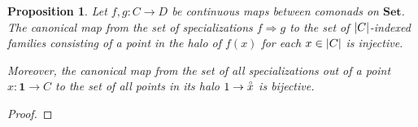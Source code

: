 \documentclass[11pt, oneside, article]{memoir}
\theoremstyle{plain}
\newtheorem{proposition}[theorem]{Proposition}
\theoremstyle{definition}
\theoremstyle{remark}
\DeclareMathOperator{\id}{id}
\DeclarePairedDelimiter{\abs}{\lvert}{\rvert}
\newcommand{\bang}{\mathrm{!}}
\newcommand{\namedcat}[1]{\mathbf{#1}}
\newcommand{\cat}[1]{\mathbf{#1}}
\newcommand{\Set}{\namedcat{Set}}
\newcommand{\CoalgOn}[2]{{#2}^{#1}}
\newcommand{\CoalgS}[1]{\CoalgOn{#1}{\bS}}
\newcommand{\clift}[1]{\overline{#1}}
\newcommand{\pts}[1]{{\abs{#1}}}
\newcommand{\one}[1]{\pts{#1}}
\newcommand{\halo}[1]{\accentset{\circ}{#1}}
\newcommand{\reindex}[1]{\Delta_{#1}}
\newcommand{\point}{\mathbf{1}}
\newcommand{\slicer}{\Delta_\bang}
\newcommand{\com}[2]{{#1}^{#2}}
\newcommand{\con}[2]{{#1}^{#2}}
\newcommand{\setof}[1]{\{#1\}}
\newcommand{\cmnd}[1]{{#1}}
\newcommand{\cA}{\cmnd{A}}
\newcommand{\cB}{\cmnd{B}}
\newcommand{\cC}{\cmnd{C}}
\newcommand{\cD}{\cmnd{D}}
\newcommand{\bS}{\cat{S}}
\newcommand{\AS}{\CoalgS{\cA}}
\newcommand{\BS}{\CoalgS{\cB}}
\newcommand{\CS}{\CoalgS{\cC}}
\newcommand{\DS}{\CoalgS{\cD}}
\newcommand{\SetpA}{\Set^\pts{\cA}}
\newcommand{\SetpB}{\Set^\pts{\cB}}
\newcommand{\SetpC}{\Set^\pts{\cC}}
\newcommand{\SetpD}{\Set^\pts{\cD}}
\newcommand{\idSet}{\id_\Set}
\begin{document}
\begin{proposition}\label{prop:spechalo}\label{prop:spechalopoint}
  Let $f, g \colon \cC \to \cD$ be continuous maps between comonads on
  $\Set$. The canonical map from the set of specializations
  $f \Rightarrow g$ to the set of $\pts{\cC}$-indexed families
  consisting of a point in the halo of $f(x)$ for each
  $x \in \pts{\cC}$ is injective.

  Moreover, the canonical map from the set of all specializations out
  of a point $x \colon \point \to \cC$ to the set of all points in its
  halo $1 \to \halo{x}$ is bijective.
\end{proposition}
\begin{proof}


\end{proof}
\end{document}
